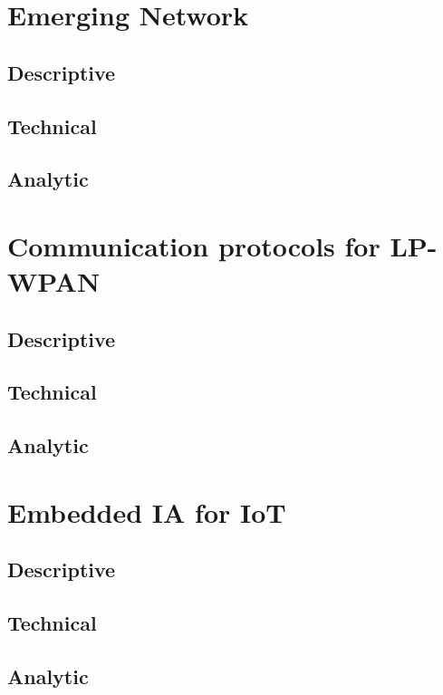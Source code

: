 \section{Emerging Network}
\subsection{Descriptive}
\subsection{Technical}
\subsection{Analytic}


\section{Communication protocols for LP-WPAN}
\subsection{Descriptive}
\subsection{Technical}
\subsection{Analytic}

\section{Embedded IA for IoT}
\subsection{Descriptive}
\subsection{Technical}
\subsection{Analytic}


